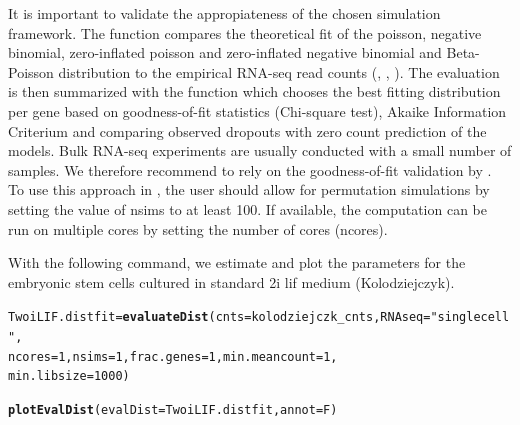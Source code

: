 \documentclass{article}\usepackage[]{graphicx}\usepackage[usenames,dvipsnames]{color}
\makeatletter
\newcommand{\hlnum}[1]{\textcolor[rgb]{0.686,0.059,0.569}{#1}}%
\newcommand{\hlstr}[1]{\textcolor[rgb]{0.192,0.494,0.8}{#1}}%
\newcommand{\hlstd}[1]{\textcolor[rgb]{0.345,0.345,0.345}{#1}}%
\newcommand{\hlkwb}[1]{\textcolor[rgb]{0.69,0.353,0.396}{#1}}%
\newcommand{\hlkwc}[1]{\textcolor[rgb]{0.333,0.667,0.333}{#1}}%
\newcommand{\hlkwd}[1]{\textcolor[rgb]{0.737,0.353,0.396}{\textbf{#1}}}%
\newenvironment{kframe}{%
 \def\at@end@of@kframe{}%
 \ifinner\ifhmode%
  \def\at@end@of@kframe{\end{minipage}}%
  \begin{minipage}{\columnwidth}%
 \fi\fi%
 \def\FrameCommand##1{\hskip\@totalleftmargin \hskip-\fboxsep
 \colorbox{shadecolor}{##1}\hskip-\fboxsep
     \hskip-\linewidth \hskip-\@totalleftmargin \hskip\columnwidth}%
 \MakeFramed {\advance\hsize-\width
   \@totalleftmargin\z@ \linewidth\hsize
   \@setminipage}}%
 {\par\unskip\endMakeFramed%
 \at@end@of@kframe}
\newenvironment{knitrout}{}{} %
\makeatother
\begin{document}
It is important to validate the appropiateness of the chosen simulation framework. The function  compares the theoretical fit of the poisson, negative binomial, zero-inflated poisson and zero-inflated negative binomial and Beta-Poisson distribution to the empirical RNA-seq read counts (\cite{Colin_Cameron2013-vb}, \cite{Kim2013-qo}, \cite{Delmans2016-ef}).
The evaluation is then summarized with the function  which chooses the best fitting distribution per gene based on goodness-of-fit statistics (Chi-square test), Akaike Information Criterium and comparing observed dropouts with zero count prediction of the models.
Bulk RNA-seq experiments are usually conducted with a small number of samples. We therefore recommend to rely on the goodness-of-fit validation by \cite{Mi2015-ri}. To use this approach in , the user should allow for permutation simulations by setting the value of nsims to at least 100. If available, the computation can be run on multiple cores by setting the number of cores (ncores).

With the following command, we estimate and plot the parameters for the embryonic stem cells cultured in standard 2i lif medium (Kolodziejczyk).

\begin{knitrout}
\color{fgcolor}\begin{kframe}
\begin{alltt}
\hlstd{TwoiLIF.distfit} \hlkwb{=} \hlkwd{evaluateDist}\hlstd{(}\hlkwc{cnts} \hlstd{= kolodziejczk_cnts,} \hlkwc{RNAseq} \hlstd{=} \hlstr{"singlecell"}\hlstd{,}
    \hlkwc{ncores} \hlstd{=} \hlnum{1}\hlstd{,} \hlkwc{nsims} \hlstd{=} \hlnum{1}\hlstd{,} \hlkwc{frac.genes} \hlstd{=} \hlnum{1}\hlstd{,} \hlkwc{min.meancount} \hlstd{=} \hlnum{1}\hlstd{,}
    \hlkwc{min.libsize} \hlstd{=} \hlnum{1000}\hlstd{)}

\hlkwd{plotEvalDist}\hlstd{(}\hlkwc{evalDist} \hlstd{= TwoiLIF.distfit,} \hlkwc{annot} \hlstd{= F)}
\end{alltt}
\end{kframe}
\end{knitrout}
\end{document}

